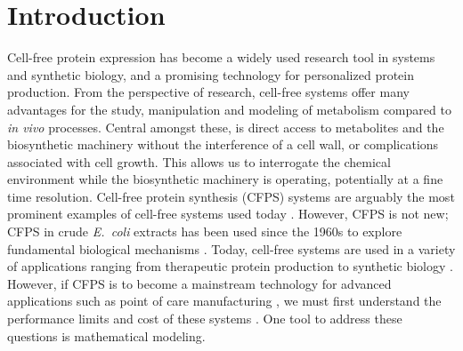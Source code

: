 \documentclass[journal=asbcd6,manuscript=article]{achemso}
\begin{document}
\section{Introduction}
Cell-free protein expression has become a widely used research tool in systems and synthetic biology, and a promising technology for personalized protein production.
From the perspective of research, cell-free systems offer many advantages for the study, manipulation and modeling of metabolism compared to \textit{in vivo} processes.
Central amongst these, is direct access to metabolites and the biosynthetic machinery without the interference of a cell wall, or complications associated with cell growth.
This allows us to interrogate the chemical environment while the biosynthetic machinery is operating, potentially at a fine time resolution.
Cell-free protein synthesis (CFPS) systems are arguably the most prominent examples of cell-free systems used today \cite{Jewett:2008aa}.
However, CFPS is not new; CFPS in crude \textit{E.~coli} extracts has been used since the 1960s to explore fundamental biological mechanisms \cite{MATTHAEI:1961aa,NIRENBERG:1961aa}.
Today, cell-free systems are used in a variety of applications ranging from therapeutic protein production \cite{Lu:2014aa} to synthetic biology \cite{Hodgman:2012aa}.
However, if CFPS is to become a mainstream technology for advanced applications such as point of care manufacturing \cite{Pardee2016248}, we must first understand the performance limits and cost of these systems \cite{Jewett:2008aa}.
One tool to address these questions is mathematical modeling.

\end{document}
